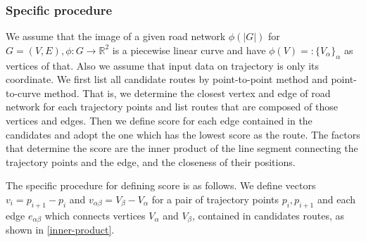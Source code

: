 \documentclass{article}
\numberwithin{equation}{section}
\theoremstyle{definition}
\begin{document}
\subsubsection*{Specific procedure}
We assume that the image of a given road network $\phi(|G|)$ for $G=(V,E), \phi:G\to\mathbb{R}^{2}$ is a piecewise linear curve and have $\phi(V)=:\{V_{\alpha}\}_{\alpha}$ as vertices of that. Also we assume that input data on trajectory is only its coordinate.
We first list all candidate routes by point-to-point method and point-to-curve method.
That is, we determine the closest vertex and edge of road network for each trajectory points and list routes that are composed of those vertices and edges.
Then we define score for each edge contained in the candidates and adopt the one which has the lowest score as the route.  
The factors that determine the score are the inner product of the line segment connecting the trajectory points and the edge, and the closeness of their positions.

The specific procedure for defining score is as follows.
We define vectors $v_{i} = p_{i+1}-p_{i}$ and $v_{\alpha\beta} = V_{\beta}-V_{\alpha}$ for a pair of trajectory points $p_{i}, p_{i+1}$ and each edge $e_{\alpha\beta}$ which connects vertices $V_{\alpha}$ and $V_{\beta}$, contained in candidates routes, as shown in \autoref{inner-product}.
\end{document}
